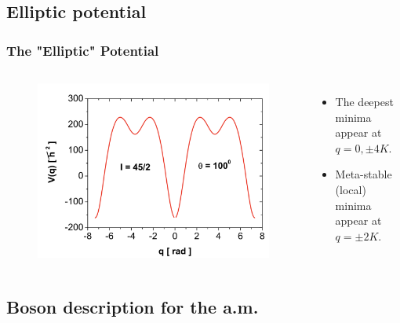 \documentclass{beamer}
\begin{document}
\subsection{Elliptic potential}

\begin{frame}
  \frametitle{The "Elliptic" Potential}
  \begin{columns}
    \begin{figure}
      \includegraphics[scale=0.18]{figures/potential-3.png}
    \end{figure}
    \begin{itemize}
      \item The deepest minima appear at $q=0,\pm4K$.
      \item Meta-stable (local) minima appear at $q=\pm2K$.
    \end{itemize}
  \end{columns}
\end{frame}

\subsection{Boson description for the a.m.}
\end{document}
